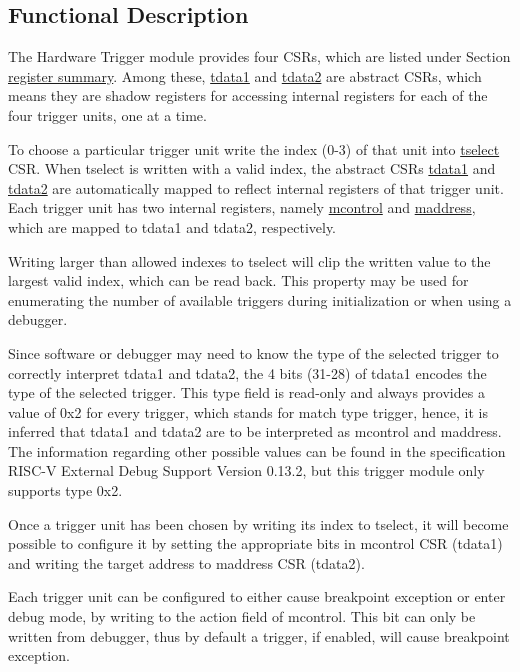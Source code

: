 \documentclass[main\_\_EN.tex]{subfiles}
\begin{document}
\subsection{Functional Description}
\label{sec:riscvcpu-hwt-func-descr}

The Hardware Trigger module provides four CSRs, which are listed under Section \hyperref[sec:riscvcpu-hwt-reg-summ]{register summary}. Among these, \hyperref[regdesc:TDATA1]{tdata1} and \hyperref[regdesc:TDATA2]{tdata2} are abstract CSRs, which means they are shadow registers for accessing internal registers for each of the four trigger units, one at a time.

To choose a particular trigger unit write the index (0-3) of that unit into \hyperref[regdesc:TSELECT]{tselect} CSR. When tselect is written with a valid index, the abstract CSRs \hyperref[regdesc:TDATA1]{tdata1} and \hyperref[regdesc:TDATA2]{tdata2} are automatically mapped to reflect internal registers of that trigger unit. Each trigger unit has two internal registers, namely \hyperref[regdesc:MCONTROL]{mcontrol} and \hyperref[regdesc:MADDRESS]{maddress}, which are mapped to tdata1 and tdata2, respectively.

Writing larger than allowed indexes to tselect will clip the written value to the largest valid index, which can be read back. This property may be used for enumerating the number of available triggers during initialization or when using a debugger.

Since software or debugger may need to know the type of the selected trigger to correctly interpret tdata1 and tdata2, the 4 bits (31-28) of tdata1 encodes the type of the selected trigger. This type field is read-only and always provides a value of 0x2 for every trigger, which stands for match type trigger, hence, it is inferred that tdata1 and tdata2 are to be interpreted as mcontrol and maddress. The information regarding other possible values can be found in the specification RISC-V External Debug Support Version 0.13.2, but this trigger module only supports type 0x2.

Once a trigger unit has been chosen by writing its index to tselect, it will become possible to configure it by setting the appropriate bits in mcontrol CSR (tdata1) and writing the target address to maddress CSR (tdata2).

Each trigger unit can be configured to either cause breakpoint exception or enter debug mode, by writing to the action field of mcontrol. This bit can only be written from debugger, thus by default a trigger, if enabled, will cause breakpoint exception.
\end{document}
